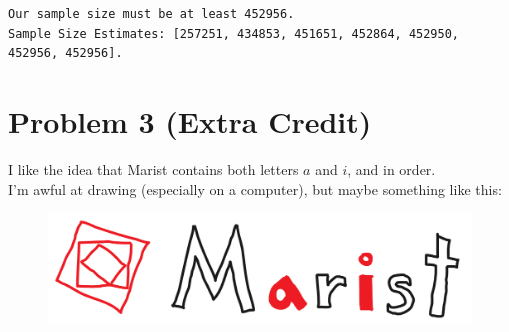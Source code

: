 \documentclass[a4paper]{article}
\begin{document}
\begin{lstlisting}
Our sample size must be at least 452956.
Sample Size Estimates: [257251, 434853, 451651, 452864, 452950, 452956, 452956].
\end{lstlisting}

\section{Problem 3 (Extra Credit)}
I like the idea that Marist contains both letters $a$ and $i$, and in order. \\
I'm awful at drawing (especially on a computer), but maybe something like this:
\begin{figure}[h]
  \begin{center}
    \includegraphics[width=140mm,scale=1]{extracredit.png}
  \end{center}
\end{figure}
\end{document}
